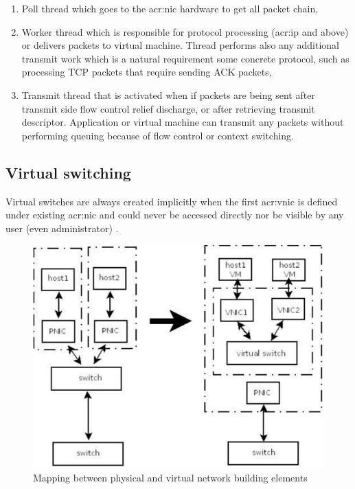 \documentclass[11pt]{book}
\begin{document}
        \begin{enumerate}
          \item Poll thread which goes to the \gls{acr:nic} hardware to get all packet chain,
          \item Worker thread which is responsible for protocol processing (\gls{acr:ip} and above) or delivers packets to virtual
                machine. Thread performs also any additional transmit work which is a natural 
                requirement some concrete protocol, such as processing TCP packets that require sending ACK packets,
          \item Transmit thread that is activated when if packets are being sent after transmit side flow control relief
                discharge, or after retrieving transmit descriptor. Application or virtual 
                machine can transmit any packets without performing queuing because of flow control or context switching.
        \end{enumerate}


      \subsection{Virtual switching}
        
        Virtual switches are always created implicitly when the first \gls{acr:vnic} is defined under existing \gls{acr:nic} and could never
        be accessed directly nor be visible by any user (even administrator) \cite{crossbow2}. 
        
        \begin{figure}[H]
          \begin{center}
            \includegraphics[width=.7\textwidth]{img/physical_and_virtual_switches_mapping.pdf}
          \end{center}

          \caption{Mapping between physical and virtual network building elements}
        \end{figure}
        
\end{document}
